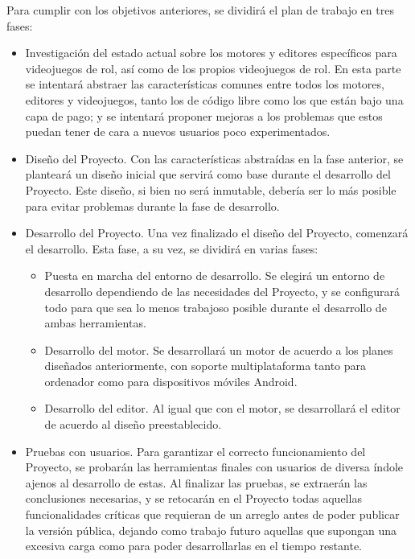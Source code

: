 Para cumplir con los objetivos anteriores, se dividirá el plan de trabajo en tres fases:
\begin{itemize}
	\item Investigación del estado actual sobre los motores y editores específicos para videojuegos de rol, así como de los propios videojuegos de rol. En esta parte se intentará abstraer las características comunes entre todos los motores, editores y videojuegos, tanto los de código libre como los que están bajo una capa de pago; y se intentará proponer mejoras a los problemas que estos puedan tener de cara a nuevos usuarios poco experimentados.
	\item Diseño del Proyecto. Con las características abstraídas en la fase anterior, se planteará un diseño inicial que servirá como base durante el desarrollo del Proyecto. Este diseño, si bien no será inmutable, debería ser lo más  posible para evitar problemas durante la fase de desarrollo.
	\item Desarrollo del Proyecto. Una vez finalizado el diseño del Proyecto, comenzará el desarrollo. Esta fase, a su vez, se dividirá en varias fases:
		\begin{itemize}
			\item Puesta en marcha del entorno de desarrollo. Se elegirá un entorno de desarrollo dependiendo de las necesidades del Proyecto, y se configurará todo para que sea lo menos trabajoso posible durante el desarrollo de ambas herramientas. 
			\item Desarrollo del motor. Se desarrollará un motor de acuerdo a los planes diseñados anteriormente, con soporte multiplataforma tanto para ordenador como para dispositivos móviles Android.
			\item Desarrollo del editor. Al igual que con el motor, se desarrollará el editor de acuerdo al diseño preestablecido.
		\end{itemize}
	\item Pruebas con usuarios. Para garantizar el correcto funcionamiento del Proyecto, se probarán las herramientas finales con usuarios de diversa índole ajenos al desarrollo de estas. Al finalizar las pruebas, se extraerán las conclusiones necesarias, y se retocarán en el Proyecto todas aquellas funcionalidades críticas que requieran de un arreglo antes de poder publicar la versión pública, dejando como trabajo futuro aquellas que supongan una excesiva carga como para poder desarrollarlas en el tiempo restante.
\end{itemize}


